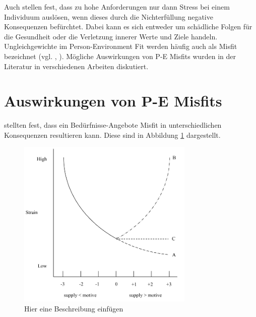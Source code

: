 Auch \textcite[S. 1ff.]{lazarus:1978} stellen fest, dass zu hohe Anforderungen nur dann Stress bei einem Individuum auslösen, wenn dieses durch die Nichterfüllung negative Konsequenzen befürchtet. Dabei kann es sich entweder um schädliche Folgen für die Gesundheit oder die Verletzung innerer Werte und Ziele handeln.\\
Ungleichgewichte im Person-Environment Fit werden häufig auch als Misfit bezeichnet (vgl. \cite[S. 2]{edwards:2004}, \cite[S. 4]{kristof:1996}). Mögliche Auswirkungen von P-E Misfits wurden in der Literatur in verschiedenen Arbeiten diskutiert.

\section{Auswirkungen von P-E Misfits}
\label{ch:personEnvironmentFit:auswirkungenErhoehterAngebote}
\textcite{mechanismsOfJobStressAndStrain:1982} stellten fest, dass ein Bedürfnisse-Angebote Misfit in unterschiedlichen Konsequenzen resultieren kann. Diese sind in Abbildung \ref{fig:personEnvironmentFit:auswirkungenErhoehterAngebote:abb1} dargestellt.\\
\begin{figure}[h]
	\centering
	\includegraphics[width=0.75\textwidth]{gfx/ueberschuss_supply_motive.png}
	\caption{Hier eine Beschreibung einfügen \cite[S. 23]{edwards:2008}}
	\label{fig:personEnvironmentFit:auswirkungenErhoehterAngebote:abb1}
\end{figure}\\
